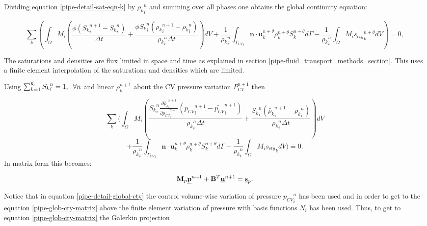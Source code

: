 Dividing equation \ref{pipe-detail-sat-eqn-k} by ${\rho_k}^n_i $ and summing
over all phases one obtains the global continuity equation:


\begin{equation}
 \sum_k \left(
\int_\Omega M_i (\frac{ \phi({S_k}_i^{n+1}-{S_k}_i^n) }{\Delta t}
+ \frac{\phi{S_k}_i^n( {\rho_k}_i^{n+1}-{\rho_k}_i^n)} {{\rho_k}_i^n\Delta t} ) dV
+ \frac{1}{{\rho_k}_i^n}\int_{{\Gamma_{CV}}_i}
{\mathbf n} \cdot {\mathbf u}_k^{n+\theta} \rho_k^{n+\theta}   S_k^{n+\theta} d\Gamma
- \frac{1}{{\rho_k}_i^n} \int_\Omega M_i {s_{cty}}_k^{n+\theta} dV \right) =0,
\label{pipe-detail-sat-eqn-k-sum}
\end{equation}

The saturations and densities are flux limited in space and
time as explained in section \ref{pipe-fluid_transport_methods_section}. This uses a finite element
interpolation of the saturations and densities which are limited.



Using $\sum_{k=1}^{\cal K} {S_k}_i^n =1, \;\; \forall n$ and linear
$\rho_k^{n+1}$ about the CV pressure variation $P_{CV}^{n+1}$ then

\begin{equation}
 \sum_k ( \int_{\Omega} M_i
( \frac{{S_k}_i^n \frac{\partial \tilde{\rho_k}_i^{n+1}}{\partial \tilde{ p_{CV}}_i^{n+1}}({p_{CV}}_i^{n+1}-\tilde{p_{CV}}_i^{n+1})
} {{\rho_k}_i^n\Delta t}
+ \frac{{S_k}_i^n( \tilde{\rho_k}_i^{n+1}-{\rho_k}_i^n)}
{{\rho_k}_i^n \Delta t} ) dV
\end{equation}
\begin{equation}
+ \frac{1}{{\rho_k}_i^n}\int_{{\Gamma_{CV}}_i} {\mathbf n} \cdot {\mathbf u}_k^{n+\theta} \rho_k^{n+\theta} S_k^{n+\theta} d\Gamma
- \frac{1}{{\rho_k}_i^n} \int_\Omega M_i {s_{cty}}_k dV ) =0.
\label{pipe-detail-global-cty}
\end{equation}
In matrix form this becomes:

\begin{equation}
{\mathbf M}_p \underline{\bf p}^{n+1} + {\mathbf B}^T \underline{\bf u}^{n+1}
= \underline{\bf s}_p.
\label{pipe-glob-cty-matrix}
\end{equation}

Notice that in equation \ref{pipe-detail-global-cty} the
control volume-wise variation of pressure ${p_{CV}}_i^n$ has been
used and in order to get to the equation  \ref{pipe-glob-cty-matrix}
above the finite element variation of pressure with basis
functions $N_i$ has been used. Thus, to get to equation
\ref{pipe-glob-cty-matrix} the Galerkin projection


